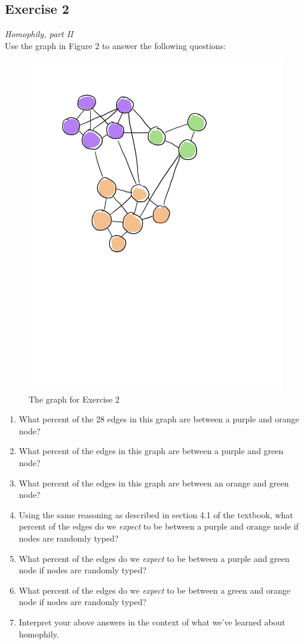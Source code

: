 \documentclass{tufte-handout}
\begin{document}
\begin{fullwidth}
\section*{\textbf{Exercise 2}}
\textit{Homophily, part II}\\
Use the graph in Figure 2 to answer the following questions:
\begin{figure}[!h]
    \centering
    \includegraphics[width = .25\textwidth]{homophilyII.pdf}
    \caption{The graph for Exercise 2}
\end{figure}
\begin{enumerate}
    \item What percent of the 28 edges in this graph are between a purple and orange node?
    \item What percent of the edges in this graph are between a purple and green node?
    \item What percent of the edges in this graph are between an orange and green node?
    \item Using the same reasoning as described in section 4.1 of the textbook, what percent of the edges do we \textit{expect} to be between a purple and orange node if nodes are randomly typed?
    \item What percent of the edges do we \textit{expect} to be between a purple and green node if nodes are randomly typed?
    \item What percent of the edges do we \textit{expect} to be between a green and orange node if nodes are randomly typed?
    \item Interpret your above answers in the context of what we've learned about homophily.
\end{enumerate}

\end{fullwidth}
\end{document}
